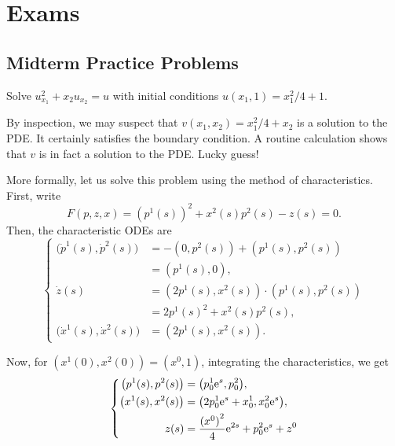 \section{Exams}
\subsection{Midterm Practice Problems}
\begin{problem}
  Solve \(u_{x_1}^2+x_2u_{x_2}=u\) with initial conditions
  \(u(x_1,1)=x_1^2/4+1\).
\end{problem}
\begin{solution*}
  By inspection, we may suspect that \(v(x_1,x_2)=x_1^2/4+x_2\) is a
  solution to the PDE. It certainly satisfies the boundary condition. A
  routine calculation shows that \(v\) is in fact a solution to the
  PDE. Lucky guess!

  More formally, let us solve this problem using the method of
  characteristics. First, write
  \[
    F(p,z,x)={(p^1(s))}^2+x^2(s)p^2(s)-z(s)=0.
  \]
  Then, the characteristic ODEs are
  \[
    \left\{
      \begin{aligned}
        \bigl(\dot p^1(s),\dot p^2(s)\bigr)
        &=-(0,p^2(s))+(p^1(s),p^2(s))\\
        &=(p^1(s),0),\\
        \dot z(s)
        &=(2p^1(s),x^2(s))\cdot (p^1(s),p^2(s))\\
        &=2p^1(s)^2+x^2(s)p^2(s),\\
        \bigl(\dot x^1(s),\dot x^2(s)\bigr)&=(2p^1(s),x^2(s)).
      \end{aligned}
    \right.
  \]

  Now, for \((x^1(0),x^2(0))=(x^0,1)\), integrating the characteristics, we
  get
  \[
    \left\{
      \begin{aligned}
        \bigl(p^1(s),p^2(s)\bigr)&=\bigl(p_0^1\mathrm{e}^s,p^2_0\bigr),\\
        \bigl(x^1(s),x^2(s)\bigr)
        &=\bigl(2p_0^1\mathrm{e}^s+x_0^1,x_0^2\mathrm{e}^s\bigr),\\
        z(s)&=\frac{{(x^0)}^2}{4}\mathrm{e}^{2s}+p_0^2\mathrm{e}^s+z^0
      \end{aligned}
    \right.
  \]


\end{solution*}
